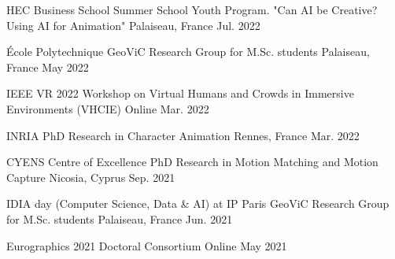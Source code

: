 

\begin{cventries}

\cvtalk
    {HEC Business School} %
    {Summer School Youth Program. "Can AI be Creative? Using AI for Animation"} %
    {Palaiseau, France} %
    {Jul. 2022} %

\cvtalk
    {École Polytechnique} %
    {GeoViC Research Group for M.Sc. students} %
    {Palaiseau, France} %
    {May 2022} %

\cvtalk
    {IEEE VR 2022} %
    {Workshop on Virtual Humans and Crowds in Immersive Environments (VHCIE)} %
    {Online} %
    {Mar. 2022} %

\cvtalk
    {INRIA} %
    {PhD Research in Character Animation} %
    {Rennes, France} %
    {Mar. 2022} %

\cvtalk
    {CYENS Centre of Excellence} %
    {PhD Research in Motion Matching and Motion Capture} %
    {Nicosia, Cyprus} %
    {Sep. 2021} %





\cvtalk
    {IDIA day (Computer Science, Data \& AI) at IP Paris} %
    {GeoViC Research Group for M.Sc. students} %
    {Palaiseau, France} %
    {Jun. 2021} %

\cvtalk
    {Eurographics 2021} %
    {Doctoral Consortium} %
    {Online} %
    {May 2021} %

\end{cventries}